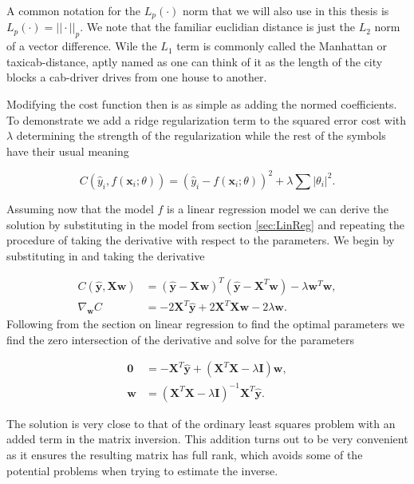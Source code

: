 \noindent A common notation for the $L_p(\cdot)$ norm that we will also use in this thesis is $L_p(\cdot) = ||\cdot||_p$. We note that the familiar euclidian distance is just the $L_2$ norm of a vector difference. Wile the $L_1$ term is commonly called the Manhattan or taxicab-distance, aptly named as one can think of it as the length of the city blocks a cab-driver drives from one house to another.

Modifying the cost function then is as simple as adding the normed coefficients. To demonstrate we add a ridge regularization term to the squared error cost with $\lambda$ determining the strength of the regularization while the rest of the symbols have their usual meaning

\begin{equation}\label{eq:mse_ridge}
C(\hat{y}_i, f(\mathbf{x}_i; \theta)) = (\hat{y}_i - f(\mathbf{x}_i; \theta))^2 + \lambda\sum|\theta_i|^2.
\end{equation}

\noindent Assuming now that the model $f$ is a linear regression model we can derive the solution by substituting in the model from section \ref{sec:LinReg} and repeating the procedure of taking the derivative with respect to the parameters. We begin by substituting in and taking the derivative 

\begin{align}
C(\mathbf{\hat{y}}, \mathbf{Xw}) &= ( \mathbf{\hat{y}} - \mathbf{Xw})^T( \mathbf{\hat{y}} - \mathbf{X}^T\mathbf{w}) - \lambda \mathbf{w}^T\mathbf{w}, \\
\nabla_\mathbf{w} C &= -2\mathbf{X}^T\mathbf{\hat{y}} + 2\mathbf{X}^T\mathbf{Xw} - 2\lambda\mathbf{w}. 
\end{align}
\noindent Following from the section on linear regression to find the optimal parameters we find the zero intersection of the derivative and solve for the parameters 

\begin{align}
\mathbf{0} &=  -\mathbf{X}^T\mathbf{\hat{y}} + (\mathbf{X}^T\mathbf{X} - \lambda \mathbf{I})\mathbf{w}, \\
\mathbf{w} &= (\mathbf{X}^T\mathbf{X} - \lambda \mathbf{I})^{-1}\mathbf{X}^T\mathbf{\hat{y}}.
\end{align}

\noindent The solution is very close to that of the ordinary least squares problem with an added term in the matrix inversion. This addition turns out to be very convenient as it ensures the resulting matrix has full rank, which avoids some of the potential problems when trying to estimate the inverse. 

